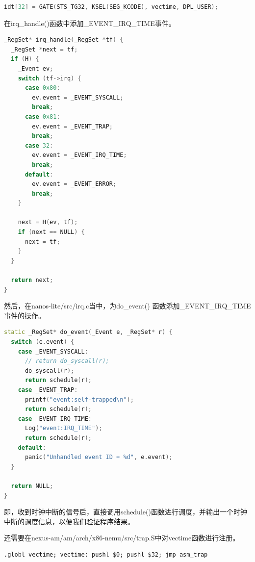 \documentclass[UTF8,a4paper,10pt]{ctexart}
\begin{document}
\begin{lstlisting}[language = C++]
idt[32] = GATE(STS_TG32, KSEL(SEG_KCODE), vectime, DPL_USER);
\end{lstlisting}
在irq\_handle()函数中添加\_EVENT\_IRQ\_TIME事件。
\begin{lstlisting}[language = C++]
_RegSet* irq_handle(_RegSet *tf) {
  _RegSet *next = tf;
  if (H) {
    _Event ev;
    switch (tf->irq) {
      case 0x80: 
        ev.event = _EVENT_SYSCALL; 
        break;
      case 0x81:
        ev.event = _EVENT_TRAP;
        break;
      case 32:
        ev.event = _EVENT_IRQ_TIME;
        break;
      default: 
        ev.event = _EVENT_ERROR; 
        break;
    }

    next = H(ev, tf);
    if (next == NULL) {
      next = tf;
    }
  }

  return next;
}
\end{lstlisting}
然后，在nanos-lite/src/irq.c当中，为do\_event() 函数添加\_EVENT\_IRQ\_TIME事件的操作。
\begin{lstlisting}[language = C++]
static _RegSet* do_event(_Event e, _RegSet* r) {
  switch (e.event) {
    case _EVENT_SYSCALL:
      // return do_syscall(r);
      do_syscall(r);
      return schedule(r);
    case _EVENT_TRAP:
      printf("event:self-trapped\n");
      return schedule(r);
    case _EVENT_IRQ_TIME: 
      Log("event:IRQ_TIME");
      return schedule(r);
    default: 
      panic("Unhandled event ID = %d", e.event);
  }

  return NULL;
}
\end{lstlisting}
即，收到时钟中断的信号后，直接调用schedule()函数进行调度，并输出一个时钟中断的调度信息，以便我们验证程序结果。

还需要在nexus-am/am/arch/x86-nemu/src/trap.S中对vectime函数进行注册。
\begin{lstlisting}[]
.globl vectime; vectime: pushl $0; pushl $32; jmp asm_trap 
\end{lstlisting}
\end{document}

